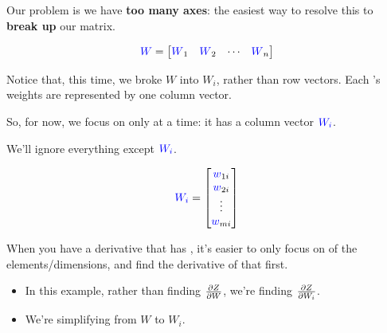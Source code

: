         \subsecdiv
        
        Our problem is we have \textbf{too many axes}: the easiest way to resolve this to \textbf{break up} our matrix. 

        \begin{equation}
            \textcolor{blue}{W}
            =
            \begin{bmatrix}
                \textcolor{blue}{W}_1 & \textcolor{blue}{W}_2 & \cdots & \textcolor{blue}{W}_n
            \end{bmatrix}
        \end{equation}

        Notice that, this time, we broke $W$ into  $W_i$, rather than row vectors. Each 's weights are represented by one column vector.
        
        So, for now, we focus on only  at a time: it has a column vector $\textcolor{blue}{W_i}$.
        
        
        We'll ignore everything except $\textcolor{blue}{W_i}$.
        
        \begin{equation}
            \textcolor{blue}{W_i} = 
            \begin{bmatrix}
                \textcolor{blue}{w}_{1i} \\ \textcolor{blue}{w}_{2i} \\ \vdots \\ \textcolor{blue}{w}_{mi}
            \end{bmatrix}
        \end{equation}

        \begin{concept}
            When you have a derivative that has , it's easier to only focus on  of the elements/dimensions, and find the derivative of that first. 

            \begin{itemize}
                \item In this example, rather than finding $\frac{\partial Z}{\partial W}$, we're finding $\frac{\partial Z}{\partial W_i}$.
                \item We're simplifying from  $W$ to  $W_i$.
            \end{itemize}
        \end{concept}

        \subsecdiv

